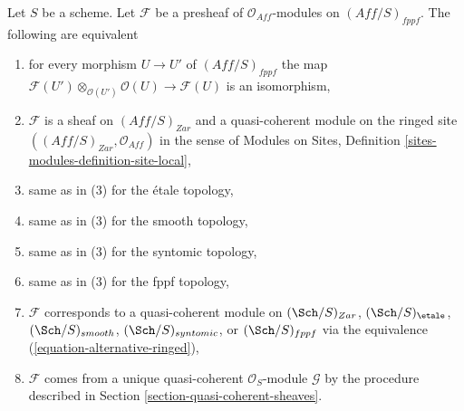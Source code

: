 \begin{lemma}
\label{lemma-quasi-coherent-alternative}
Let $S$ be a scheme. Let $\mathcal{F}$ be a presheaf
of $\mathcal{O}_{\textit{Aff}}$-modules on $(\textit{Aff}/S)_{fppf}$.
The following are equivalent
\begin{enumerate}
\item for every morphism $U \to U'$ of $(\textit{Aff}/S)_{fppf}$ the map
$\mathcal{F}(U') \otimes_{\mathcal{O}(U')} \mathcal{O}(U) \to \mathcal{F}(U)$
is an isomorphism,
\item $\mathcal{F}$ is a sheaf on $(\textit{Aff}/S)_{Zar}$ and
a quasi-coherent module on the ringed site
$((\textit{Aff}/S)_{Zar}, \mathcal{O}_{\textit{Aff}})$ in the sense of
Modules on Sites, Definition \ref{sites-modules-definition-site-local},
\item same as in (3) for the \'etale topology,
\item same as in (3) for the smooth topology,
\item same as in (3) for the syntomic topology,
\item same as in (3) for the fppf topology,
\item $\mathcal{F}$ corresponds to a quasi-coherent module on
$(\Sch/S)_{Zar}$,
$(\Sch/S)_\etale$,
$(\Sch/S)_{smooth}$,
$(\Sch/S)_{syntomic}$, or
$(\Sch/S)_{fppf}$
via the equivalence (\ref{equation-alternative-ringed}),
\item $\mathcal{F}$ comes from a unique quasi-coherent
$\mathcal{O}_S$-module $\mathcal{G}$ by the procedure
described in Section \ref{section-quasi-coherent-sheaves}.
\end{enumerate}
\end{lemma}

